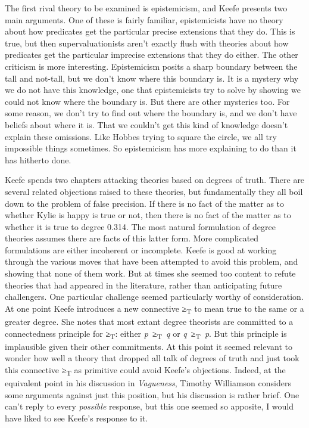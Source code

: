 \documentclass[
  11pt,
  letterpaper,
  DIV=11,
  numbers=noendperiod,
  twoside]{scrartcl}
\begin{document}
The first rival theory to be examined is epistemicism, and Keefe
presents two main arguments. One of these is fairly familiar,
epistemicists have no theory about how predicates get the particular
precise extensions that they do. This is true, but then
supervaluationists aren't exactly flush with theories about how
predicates get the particular imprecise extensions that they do either.
The other criticism is more interesting. Epistemicism posits a sharp
boundary between the tall and not-tall, but we don't know where this
boundary is. It is a mystery why we do not have this knowledge, one that
epistemicists try to solve by showing we could not know where the
boundary is. But there are other mysteries too. For some reason, we
don't try to find out where the boundary is, and we don't have beliefs
about where it is. That we couldn't get this kind of knowledge doesn't
explain these omissions. Like Hobbes trying to square the circle, we all
try impossible things sometimes. So epistemicism has more explaining to
do than it has hitherto done.

Keefe spends two chapters attacking theories based on degrees of truth.
There are several related objections raised to these theories, but
fundamentally they all boil down to the problem of false precision. If
there is no fact of the matter as to whether Kylie is happy is true or
not, then there is no fact of the matter as to whether it is true to
degree 0.314. The most natural formulation of degree theories assumes
there are facts of this latter form. More complicated formulations are
either incoherent or incomplete. Keefe is good at working through the
various moves that have been attempted to avoid this problem, and
showing that none of them work. But at times she seemed too content to
refute theories that had appeared in the literature, rather than
anticipating future challengers. One particular challenge seemed
particularly worthy of consideration. At one point Keefe introduces a
new connective ≥\textsubscript{T} to mean true to the same or a greater
degree. She notes that most extant degree theorists are committed to a
connectedness principle for ≥\textsubscript{T}: either
\emph{p}~≥\textsubscript{T}~\emph{q} or
\emph{q}~≥\textsubscript{T}~\emph{p}. But this principle is implausible
given their other commitments. At this point it seemed relevant to
wonder how well a theory that dropped all talk of degrees of truth and
just took this connective ≥\textsubscript{T} as primitive could avoid
Keefe's objections. Indeed, at the equivalent point in his discussion in
\emph{Vagueness}, Timothy Williamson considers some arguments against
just this position, but his discussion is rather brief. One can't reply
to every \emph{possible} response, but this one seemed so apposite, I
would have liked to see Keefe's response to it.
\end{document}

